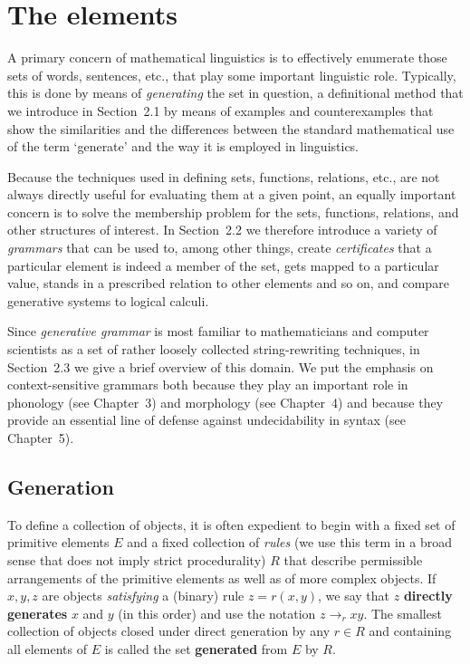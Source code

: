 \chapter{The elements}

A primary concern of mathematical linguistics is to effectively enumerate
those sets of words, sentences, etc., that play some important linguistic role.
Typically, this is done by means of {\it generating} the set in question, a
definitional method that we introduce in Section~2.1 by means of examples and
counterexamples that show the similarities and the differences between the
standard mathematical use of the term `generate' and the way it is employed in
linguistics.  

Because the techniques used in defining sets, functions, relations, etc., are
not always directly useful for evaluating them at a given point, an equally
important concern is to solve the membership problem for the sets, functions,
relations, and other structures of interest.  In
Section~2.2 we therefore introduce a variety of {\it grammars} that can be
used to, among other things, create {\it certificates} that a particular
element is indeed a member of the set, gets mapped to a particular value,
stands in a prescribed relation to other elements and so on, and compare
generative systems to logical calculi.

Since {\it generative grammar} is most familiar to mathematicians and computer
scientists as a set of rather loosely collected string-rewriting techniques,
in Section~2.3 we give a brief overview of this domain.  We put the emphasis on
context-sensitive grammars both because they play an important role in
phonology (see Chapter~3) and morphology (see Chapter~4) and because they
provide an essential line of defense against undecidability in syntax (see
Chapter~5).
 

\section{Generation}

To define a collection of objects, it is often expedient to begin with a fixed
set of primitive elements $E$ and a fixed collection of {\it rules} (we use
this term in a broad sense that does not imply strict procedurality) $R$ that
describe permissible arrangements of the primitive elements as well as of more
complex objects. If $x, y, z$ are objects {\it satisfying} a (binary) rule
$z=r(x,y)$, we say that $z$ {\bf directly generates} $x$ and $y$ (in this
order) and use the notation $z \rightarrow_r xy$. The smallest collection of
objects closed under direct generation by any $r \in R$ and containing all
elements of $E$ is called the set {\bf generated} from $E$ by $R$.

